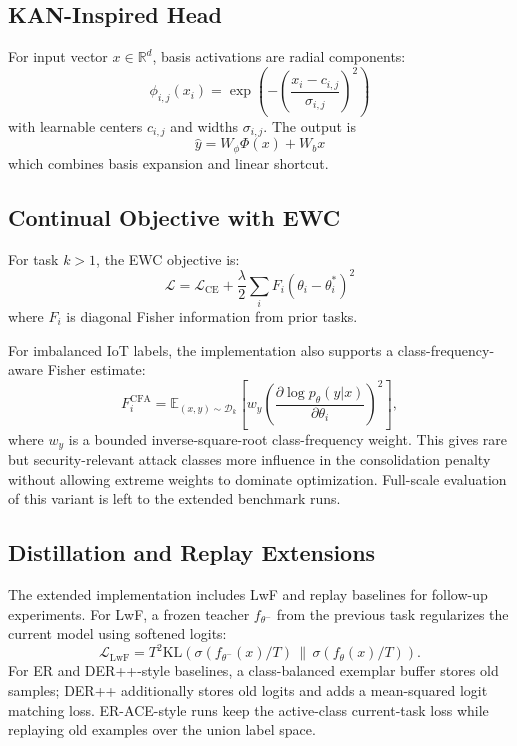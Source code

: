 \documentclass[a4paper,fleqn]{cas-dc}
\begin{document}
\subsection{KAN-Inspired Head}
For input vector $x\in\mathbb{R}^{d}$, basis activations are radial components:
\begin{equation}
\phi_{i,j}(x_i)=\exp\left(-\left(\frac{x_i-c_{i,j}}{\sigma_{i,j}}\right)^2\right)
\end{equation}
with learnable centers $c_{i,j}$ and widths $\sigma_{i,j}$. The output is
\begin{equation}
\hat{y}=W_{\phi}\Phi(x)+W_b x
\end{equation}
which combines basis expansion and linear shortcut.

\subsection{Continual Objective with EWC}
For task $k>1$, the EWC objective is:
\begin{equation}
\mathcal{L}=\mathcal{L}_{\text{CE}}+\frac{\lambda}{2}\sum_i F_i(\theta_i-\theta_i^*)^2
\end{equation}
where $F_i$ is diagonal Fisher information from prior tasks.

For imbalanced IoT labels, the implementation also supports a class-frequency-aware Fisher estimate:
\begin{equation}
F_i^{\text{CFA}}=\mathbb{E}_{(x,y)\sim\mathcal{D}_k}
\left[w_y\left(\frac{\partial \log p_\theta(y|x)}{\partial\theta_i}\right)^2\right],
\end{equation}
where $w_y$ is a bounded inverse-square-root class-frequency weight. This gives rare but security-relevant attack classes more influence in the consolidation penalty without allowing extreme weights to dominate optimization. Full-scale evaluation of this variant is left to the extended benchmark runs.

\subsection{Distillation and Replay Extensions}
The extended implementation includes LwF and replay baselines for follow-up experiments. For LwF, a frozen teacher $f_{\theta^-}$ from the previous task regularizes the current model using softened logits:
\begin{equation}
\mathcal{L}_{\text{LwF}}=T^2\text{KL}\left(
\sigma(f_{\theta^-}(x)/T)\,\|\,\sigma(f_\theta(x)/T)
\right).
\end{equation}
For ER and DER++-style baselines, a class-balanced exemplar buffer stores old samples; DER++ additionally stores old logits and adds a mean-squared logit matching loss. ER-ACE-style runs keep the active-class current-task loss while replaying old examples over the union label space.
\end{document}
